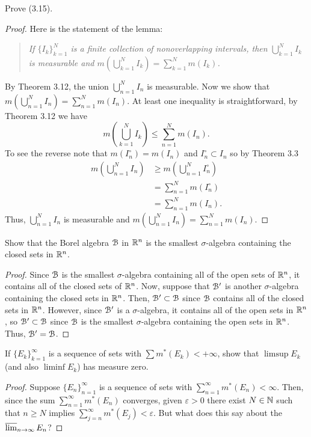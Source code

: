 \begin{problem}
  Prove (3.15).
\end{problem}
\begin{proof}
  Here is the statement of the lemma:
  \begin{quote}
    \emph{If ${\{I_k\}}_{k=1}^{N}$ is a finite collection of nonoverlapping
      intervals, then $\bigcup_{k=1}^NI_k$ is measurable and
      $m\left(\bigcup_{k=1}^NI_k\right)=\sum_{k=1}^Nm(I_k)$.}
  \end{quote}
  By Theorem 3.12, the union $\bigcup_{n=1}^N I_n$ is measurable. Now we
  show that $m\left(\bigcup_{n=1}^NI_n\right)=\sum_{n=1}^Nm(I_n)$. At least
  one inequality is straightforward, by Theorem 3.12 we have
  \[
    m\left(\bigcup_{k=1}^N I_k\right)\leq\sum_{n=1}^Nm(I_n).
  \]
  To see the reverse note that $m(I_n^\circ)=m(I_n)$ and
  $I_n^\circ\subset I_n$ so by Theorem 3.3
  \begin{align*}
    m\left(\bigcup_{n=1}^NI_n\right)
    &\geq m\left(\bigcup_{n=1}^NI_n^\circ\right)\\
    &=\sum_{n=1}^Nm(I_n^\circ)\\
    &=\sum_{n=1}^Nm(I_n).
  \end{align*}
  Thus, $\bigcup_{n=1}^N I_n$ is measurable and
  $m\left(\bigcup_{n=1}^NI_n\right)=\sum_{n=1}^Nm(I_n)$.
\end{proof}

\begin{problem}
  Show that the Borel algebra $\mathcal{B}$ in $\mathbb{R}^n$ is the smallest
  $\sigma$-algebra containing the closed sets in $\mathbb{R}^n$.
\end{problem}
\begin{proof}
  Since $\mathcal{B}$ is the smallest $\sigma$-algebra containing all of the open
  sets of $\mathbb{R}^n$, it contains all of the closed sets of $\mathbb{R}^n$. Now,
  suppose that $\mathcal{B}'$ is another $\sigma$-algebra containing the closed
  sets in $\mathbb{R}^n$. Then, $\mathcal{B}'\subset\mathcal{B}$ since $\mathcal{B}$ contains all
  of the closed sets in $\mathbb{R}^n$. However, since $\mathcal{B}'$ is a
  $\sigma$-algebra, it contains all of the open sets in $\mathbb{R}^n$, so
  $\mathcal{B}'\subset\mathcal{B}$ since $\mathcal{B}$ is the smallest $\sigma$-algebra
  containing the open sets in $\mathbb{R}^n$. Thus, $\mathcal{B}'=\mathcal{B}$.
\end{proof}

\begin{problem}
  If ${\{E_k\}}_{k=1}^\infty$ is a sequence of sets with
  $\sum m^*(E_k)<+\infty$, show that $\limsup E_k$ (and also $\liminf E_k$)
  has measure zero.
\end{problem}
\begin{proof}
  Suppose ${\{E_n\}}_{n=1}^\infty$ is a sequence of sets with
  $\sum_{n=1}^\infty m^*(E_n)<\infty$. Then, since the sum
  $\sum_{n=1}^\infty m^*(E_n)$ converges, given $\varepsilon>0$ there
  exist $N\in\mathbb{N}$ such that $n\geq N$ implies
  $\sum_{j=n}^\infty m^*(E_j)<\varepsilon$. But what does this say about
  the $\varlimsup_{n\to\infty} E_n$?
\end{proof}

